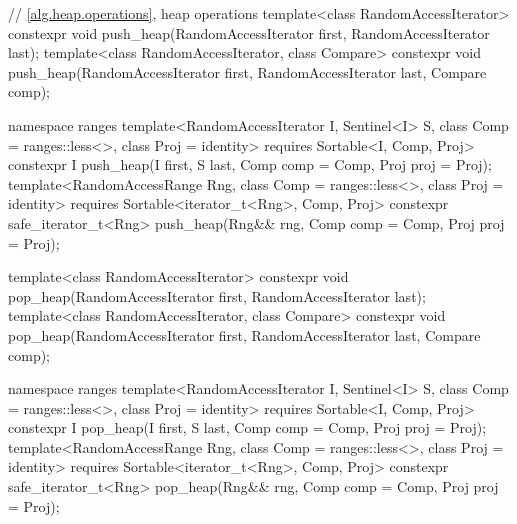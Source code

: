 \begin{codeblock}
  // \ref{alg.heap.operations}, heap operations
  template<class RandomAccessIterator>
    constexpr void push_heap(RandomAccessIterator first, RandomAccessIterator last);
  template<class RandomAccessIterator, class Compare>
    constexpr void push_heap(RandomAccessIterator first, RandomAccessIterator last,
                             Compare comp);
\end{codeblock}\begin{addedblock}\begin{codeblock}
  namespace ranges {
    template<RandomAccessIterator I, Sentinel<I> S, class Comp = ranges::less<>,
        class Proj = identity>
      requires Sortable<I, Comp, Proj>
      constexpr I
        push_heap(I first, S last, Comp comp = Comp{}, Proj proj = Proj{});
    template<RandomAccessRange Rng, class Comp = ranges::less<>, class Proj = identity>
      requires Sortable<iterator_t<Rng>, Comp, Proj>
      constexpr safe_iterator_t<Rng>
        push_heap(Rng&& rng, Comp comp = Comp{}, Proj proj = Proj{});
  }
\end{codeblock}\end{addedblock}\begin{codeblock}

  template<class RandomAccessIterator>
    constexpr void pop_heap(RandomAccessIterator first, RandomAccessIterator last);
  template<class RandomAccessIterator, class Compare>
    constexpr void pop_heap(RandomAccessIterator first, RandomAccessIterator last,
                            Compare comp);
\end{codeblock}\begin{addedblock}\begin{codeblock}
  namespace ranges {
    template<RandomAccessIterator I, Sentinel<I> S, class Comp = ranges::less<>,
        class Proj = identity>
      requires Sortable<I, Comp, Proj>
      constexpr I
        pop_heap(I first, S last, Comp comp = Comp{}, Proj proj = Proj{});
    template<RandomAccessRange Rng, class Comp = ranges::less<>, class Proj = identity>
      requires Sortable<iterator_t<Rng>, Comp, Proj>
      constexpr safe_iterator_t<Rng>
        pop_heap(Rng&& rng, Comp comp = Comp{}, Proj proj = Proj{});
  }
\end{codeblock}\end{addedblock}\begin{codeblock}


\end{codeblock}
